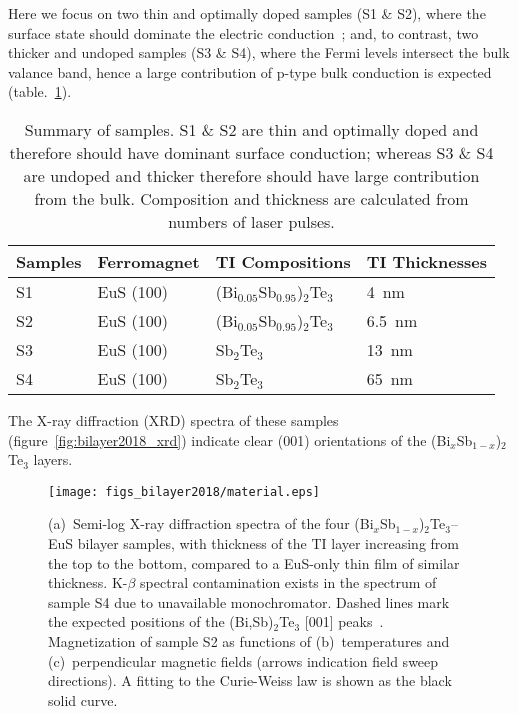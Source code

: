 Here we focus on two thin and optimally doped samples (S1 \& S2), where the surface state should dominate the electric conduction~\cite{ZhangJS2011}; and, to contrast, two thicker and undoped samples (S3 \& S4), where the Fermi levels intersect the bulk valance band, hence a large contribution of p-type bulk conduction is expected (table.~\ref{tab:bl2018_samples}). 
\begin{table}[ht]
    \centering
    \begin{tabularx}{0.7\columnwidth}[t]{l|l|l|X}
		\hline\hline
        Samples & Ferromagnet & TI Compositions & TI Thicknesses\\
        \hline%
        S1 & EuS (100) & (Bi$_{0.05}$Sb$_{0.95}$)$_2$Te$_3$ & 4~nm\\
        S2 & EuS (100) & (Bi$_{0.05}$Sb$_{0.95}$)$_2$Te$_3$ & 6.5~nm\\
        S3 & EuS (100) & Sb$_2$Te$_3$ & 13~nm\\
        S4 & EuS (100) & Sb$_2$Te$_3$ & 65~nm\\
		\hline\hline
    \end{tabularx}
    \caption[Summary of (Bi$_x$Sb$_{1-x}$)$_2$Te$_3$--EuS bilayer samples presented in Chapter~\ref{ch:bilayer2018}]{\label{tab:bl2018_samples}Summary of samples. S1 \& S2 are thin and optimally doped and therefore should have dominant surface conduction; whereas S3 \& S4 are undoped and thicker therefore should have large contribution from the bulk. Composition and thickness are calculated from numbers of laser pulses.}
\end{table}
The X-ray diffraction (XRD) spectra of these samples (figure~\ref{fig:bilayer2018_xrd}) indicate clear (001) orientations of the (Bi$_{x}$Sb$_{1-x}$)$_2$Te$_3$ layers. %
%
%
\begin{figure}[ht]%
    \centering%
    \texttt{[image: figs\_bilayer2018/material.eps]}%
    \subfloat{\label{fig:bilayer2018_xrd}}%
    \subfloat{\label{fig:bilayer2018_mvt}}%
    \subfloat{\label{fig:bilayer2018_mvh}}%
    \caption[X-Ray diffraction spectra and SQUID magnetometry of (Bi$_{x}$Sb$_{1-x}$)$_2$Te$_3$--EuS bilayer samples.]{\label{fig:bilayer2018_material}(a)~Semi-log X-ray diffraction spectra of the four (Bi$_{x}$Sb$_{1-x}$)$_2$Te$_3$--EuS bilayer samples, with thickness of the TI layer increasing from the top to the bottom, compared to a EuS-only thin film of similar thickness. K-$\beta$ spectral contamination exists in the spectrum of sample S4 due to unavailable monochromator. Dashed lines mark the expected positions of the (Bi,Sb)$_2$Te$_3$ [001] peaks~\protect\cite{SbStructure}. Magnetization of sample S2 as functions of (b)~temperatures and (c)~perpendicular magnetic fields (arrows indication field sweep directions). A fitting to the Curie-Weiss law is shown as the black solid curve.}%
\end{figure}%

